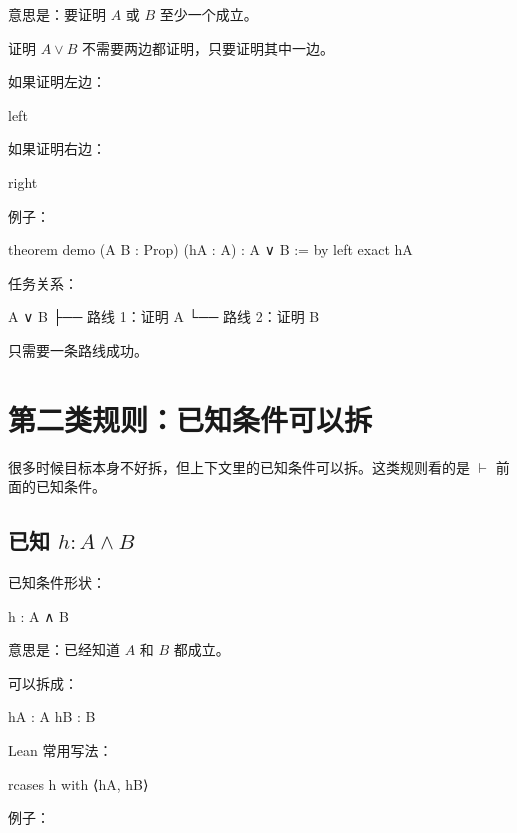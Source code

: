 \documentclass[UTF8,12pt]{ctexart}
\begin{document}
意思是：要证明 \(A\) 或 \(B\) 至少一个成立。

证明 \(A \lor B\) 不需要两边都证明，只要证明其中一边。

如果证明左边：

\begin{LeanCode}
left
\end{LeanCode}

如果证明右边：

\begin{LeanCode}
right
\end{LeanCode}

例子：

\begin{LeanCode}
theorem demo
  (A B : Prop)
  (hA : A) :
  A ∨ B := by
  left
  exact hA
\end{LeanCode}

任务关系：

\begin{Tree}
A ∨ B
├── 路线 1：证明 A
└── 路线 2：证明 B
\end{Tree}

只需要一条路线成功。

\section{第二类规则：已知条件可以拆}

很多时候目标本身不好拆，但上下文里的已知条件可以拆。这类规则看的是 \(\vdash\) 前面的已知条件。

\subsection{已知 \(h : A \land B\)}

已知条件形状：

\begin{LeanCode}
h : A ∧ B
\end{LeanCode}

意思是：已经知道 \(A\) 和 \(B\) 都成立。

可以拆成：

\begin{LeanCode}
hA : A
hB : B
\end{LeanCode}

Lean 常用写法：

\begin{LeanCode}
rcases h with ⟨hA, hB⟩
\end{LeanCode}

例子：
\end{document}
